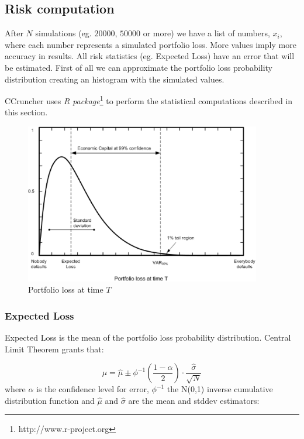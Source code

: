 \documentclass[a4paper,12pt,final]{article}
\begin{document}
\subsection{Risk computation}
After $N$ simulations (eg. $20000$, $50000$ or more) we have a list
of numbers, $x_i$, where each number represents a simulated portfolio loss. More 
values imply more accuracy in results. All risk statistics (eg. Expected Loss) 
have an error that will be estimated. First of all we can approximate the 
portfolio loss probability distribution creating an histogram with the simulated 
values. 
\newline

CCruncher uses \emph{R package}\footnote{http://www.r-project.org} to perform 
the statistical computations described in this section.

\begin{figure}[!hb]
\begin{center}
\includegraphics[height=7cm, angle=0]{./images/creditvar.eps}
\caption{Portfolio loss at time $T$}
\label{creditvar}
\end{center}
\end{figure}

\subsubsection{Expected Loss}
Expected Loss is the mean of the portfolio loss probability distribution.
Central Limit Theorem \cite{stats:schaum} grants that:

\begin{displaymath}
\mu = \widehat{\mu} \pm \phi^{-1}\left(\frac{1-\alpha}{2}\right) \cdot \frac{\widehat{\sigma}}{\sqrt{N}}
\end{displaymath}
where $\alpha$ is the confidence level for error, $\phi^{-1}$ the N(0,1) inverse 
cumulative distribution function and $\widehat{\mu}$ and $\widehat{\sigma}$ are 
the mean and stddev estimators:
\end{document}
